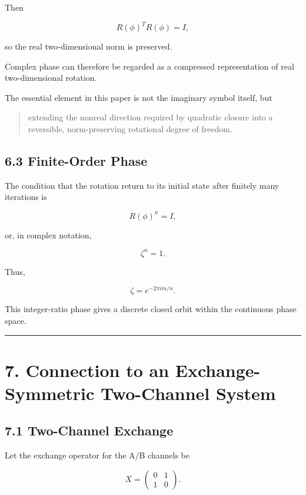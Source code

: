 \documentclass[
  a4paper,
  10pt]{article}
\begin{document}
Then

\[
R(\phi)^TR(\phi)=I,
\]

so the real two-dimensional norm is preserved.

Complex phase can therefore be regarded as a compressed representation
of real two-dimensional rotation.

The essential element in this paper is not the imaginary symbol itself,
but

\begin{quote}
extending the nonreal direction required by quadratic closure into a
reversible, norm-preserving rotational degree of freedom.
\end{quote}

\subsection{6.3 Finite-Order Phase}\label{63-finite-order-phase}

The condition that the rotation return to its initial state after
finitely many iterations is

\[
R(\phi)^n=I,
\]

or, in complex notation,

\[
\zeta^n=1.
\]

Thus,

\[
\zeta=e^{-2\pi im/n}.
\]

This integer-ratio phase gives a discrete closed orbit within the
continuous phase space.

\begin{center}\rule{0.5\linewidth}{0.5pt}\end{center}

\section{7. Connection to an Exchange-Symmetric Two-Channel
System}\label{7-connection-to-an-exchange-symmetric-two-channel-system}

\subsection{7.1 Two-Channel Exchange}\label{71-two-channel-exchange}

Let the exchange operator for the A/B channels be

\[
X=
\begin{pmatrix}
0&1\\
1&0
\end{pmatrix}.
\]
\end{document}
